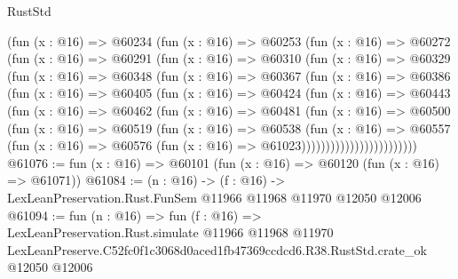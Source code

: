 \begin{lexlean}{RustStd}
\begin{coremodule}
            (fun (x : @16) =>
            @60234
              (fun (x : @16) =>
              @60253
                (fun (x : @16) =>
                @60272
                  (fun (x : @16) =>
                  @60291
                    (fun (x : @16) =>
                    @60310
                      (fun (x : @16) =>
                      @60329
                        (fun (x : @16) =>
                        @60348
                          (fun (x : @16) =>
                          @60367
                            (fun (x : @16) =>
                            @60386
                              (fun (x : @16) =>
                              @60405
                                (fun (x : @16) =>
                                @60424
                                  (fun (x : @16) =>
                                  @60443
                                    (fun (x : @16) =>
                                    @60462
                                      (fun (x : @16) =>
                                      @60481
                                        (fun (x : @16) =>
                                        @60500
                                          (fun (x : @16) =>
                                          @60519
                                            (fun (x : @16) =>
                                            @60538
                                              (fun (x : @16) =>
                                              @60557
                                                (fun (x : @16) =>
                                                @60576
                                                  (fun (x : @16) => @61023))))))))))))))))))))))))
@61076 := fun (x : @16) => @60101 (fun (x : @16) => @60120 (fun (x : @16) => @61071))
@61084 := (n : @16) ->
  (f : @16) -> LexLeanPreservation.Rust.FunSem @11966 @11968 @11970 @12050 @12006
@61094 := fun (n : @16) =>
  fun (f : @16) =>
  LexLeanPreservation.Rust.simulate
    @11966
    @11968
    @11970
    LexLeanPreserve.C52fc0f1c3068d0aced1fb47369ccdcd6.R38.RustStd.crate_ok
    @12050
    @12006
\end{coremodule}
\end{lexlean}
